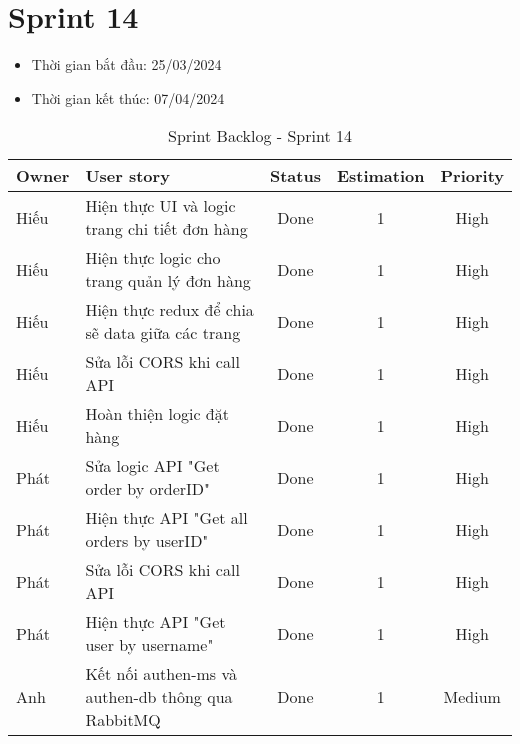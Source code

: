 \section{Sprint 14}
\begin{itemize}
    \item Thời gian bắt đầu: 25/03/2024
    \item Thời gian kết thúc: 07/04/2024
\end{itemize}
\begin{table}[H]
    \begin{tabular}{|m{2.5cm}|m{6cm}|c|c|c|}
    \hline
    \textbf{Owner}  & \textbf{User story}                                & \textbf{Status} & \textbf{Estimation} & \textbf{Priority} \\ \hline
    Hiếu                & Hiện thực UI và logic trang chi tiết đơn hàng                   & Done            & 1                   & High         \\ \hline
    Hiếu               & Hiện thực logic cho trang quản lý đơn hàng                   & Done            & 1                   & High         \\ \hline
    Hiếu                & Hiện thực redux để chia sẽ data giữa các trang                 & Done            & 1                   & High         \\ \hline
    Hiếu               & Sửa lỗi CORS khi call API                     & Done           & 1                   & High         \\ \hline
    Hiếu               & Hoàn thiện logic đặt hàng                     & Done            & 1                   & High         \\ \hline
    Phát               & Sửa logic API "Get order by orderID"                     & Done            & 1                   & High         \\ \hline
    Phát               & Hiện thực API "Get all orders by userID"                    & Done            & 1                   & High         \\ \hline
    Phát               & Sửa lỗi CORS khi call API                     & Done            & 1                   & High         \\ \hline
    Phát               & Hiện thực API "Get user by username"                    & Done            & 1                   & High         \\ \hline
    Anh              & Kết nối authen-ms và authen-db thông qua RabbitMQ                     & Done            & 1                   & Medium        \\ \hline
    \end{tabular}
    \caption{Sprint Backlog - Sprint 14}
    \label{tab:sprint-14}
\end{table}
